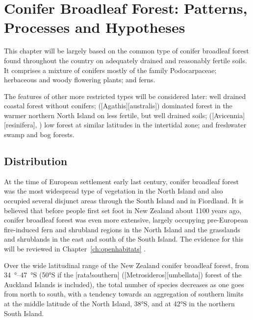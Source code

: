 \chapter{Conifer Broadleaf Forest: Patterns, Processes and Hypotheses}%
\label{ch:coniferpatterns}

This chapter will be largely based on the common type of conifer broadleaf forest found throughout the country on adequately drained and reasonably fertile soils.
It comprises a mixture of conifers mostly of the family Podocarpaceae; herbaceous and woody flowering plants; and ferns.

The features of other more restricted types will be considered later: well drained coastal forest without conifers;  ([Agathis][australis]) dominated forest in the warmer northern North Island on less fertile, but well drained soils;  ([Avicennia][resinifera], ) low forest at similar latitudes in the intertidal zone; and freshwater swamp and bog forests.

\section{Distribution}

At the time of European settlement early last century, conifer broadleaf forest was the most widespread type of vegetation in the North Island and also occupied several disjunct areas through the South Island and in Fiordland.
It is believed that before people first set foot in New Zealand about 1100 years ago, conifer broadleaf forest was even more extensive, largely occupying pre-European fire-induced fern and shrubland regions in the North Island and the grasslands and shrublands in the east and south of the South Island.
The evidence for this will be reviewed in Chapter~\ref{ch:openhabitats} .

Over the wide latitudinal range of the New Zealand conifer broadleaf forest, from \SIrange{34}{47}{\degree}S (\ang{50}S if the [rata!southern] ([Metrosideros][umbellata]) forest of the Auckland Islands is included), the total number of species decreases as one goes from north to south, with a tendency towards an aggregation of southern limits at the middle latitude of the North Island, \ang{38}S, and at \ang{42}S in the northern South Island.

